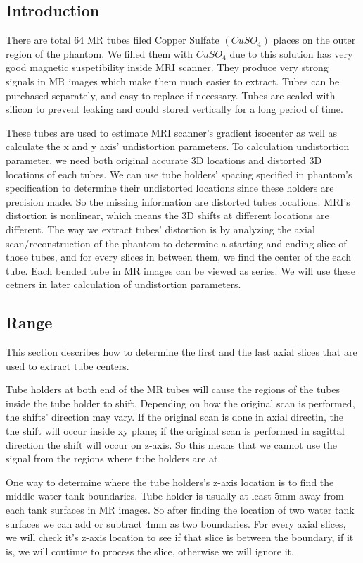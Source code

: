 \subsection{Introduction}
There are total 64 MR tubes filed Copper Sulfate $(CuSO_4)$ places on the outer region of the phantom.
We filled them with $CuSO_4$ due to this solution has very good magnetic suspetibility inside MRI scanner. 
They produce very strong signals in MR images which make them much easier to extract. Tubes can be purchased
separately, and easy to replace if necessary. Tubes are sealed with silicon to prevent leaking and could stored
vertically for a long period of time. 

These tubes are used to estimate MRI scanner's gradient isocenter as well as calculate the x and y axis' 
undistortion parameters. To calculation undistortion parameter, we need both original accurate 3D locations
and distorted 3D locations of each tubes. We can use tube holders' spacing specified in phantom's 
specification to determine their undistorted locations since these holders are precision made. So the missing
information are distorted tubes locations. MRI's distortion is nonlinear, which means the 3D shifts at
different locations are different. The way we extract tubes' distortion is by analyzing the axial 
scan/reconstruction of the phantom to determine a starting and ending slice of those tubes, and for every
slices in between them, we find the center of the each tube. Each bended tube in MR images can be viewed as
series. We will use these cetners in later calculation of undistortion parameters.

\subsection{Range}
This section describes how to determine the first and the last axial slices that are used to extract
tube centers.

Tube holders at both end of the MR tubes will cause the regions of the tubes inside the tube holder to shift. 
Depending on how the original scan is performed, the shifts' direction may vary. If the original scan is
done in axial directin, the the shift will occur inside xy plane; if the original scan is performed in
sagittal direction the shift will occur on z-axis. So this means that we cannot use the signal from the 
regions where tube holders are at. 

One way to determine where the tube holders's z-axis location is to find the middle water tank boundaries. 
Tube holder is usually at least 5mm away from each  tank surfaces in MR images. So after finding the location
of two water tank surfaces we can add or subtract 4mm as two boundaries. For every axial slices, we will
check it's z-axis location to see if that slice is between the boundary, if it is, we will continue to process
the slice, otherwise we will ignore it.


